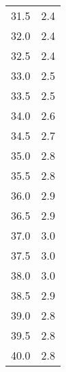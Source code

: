 \begin{table}
\begin{tabular}{S[]S[]}
31.5 & 2.4\\
32.0 & 2.4\\
32.5 & 2.4\\
33.0 & 2.5\\
33.5 & 2.5\\
34.0 & 2.6\\
34.5 & 2.7\\
35.0 & 2.8\\
35.5 & 2.8\\
36.0 & 2.9\\
36.5 & 2.9\\
37.0 & 3.0\\
37.5 & 3.0\\
38.0 & 3.0\\
38.5 & 2.9\\
39.0 & 2.8\\
39.5 & 2.8\\
40.0 & 2.8\\
\bottomrule
\end{tabular}\end{table}